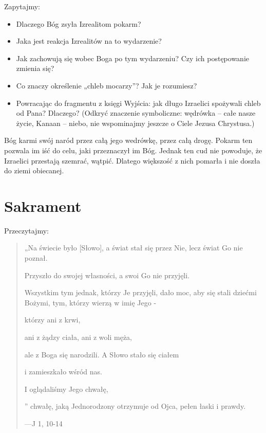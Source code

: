 \documentclass[a5paper,10pt,polish]{book}
\begin{document}
Zapytajmy:
\begin{itemize}
\item {} 
Dlaczego Bóg zsyła Izrealitom pokarm?

\item {} 
Jaka jest reakcja Izrealitów na to wydarzenie?

\item {} 
Jak zachowują się wobec Boga po tym wydarzeniu? Czy ich postępowanie zmienia się?

\item {} 
Co znaczy określenie „chleb mocarzy”? Jak je rozumiesz?

\item {} 
Powracając do fragmentu z księgi Wyjścia: jak długo Izraelici spożywali chleb od Pana? Dlaczego? (Odkryć znaczenie symboliczne: wędrówka – całe nasze życie, Kanaan – niebo, nie wspominajmy jeszcze o Ciele Jezusa Chrystusa.)

\end{itemize}

Bóg karmi swój naród przez całą jego wedrówkę, przez całą drogę. Pokarm ten pozwala im iść do celu, jaki przeznaczył im Bóg. Jednak ten cud nie powoduje, że Izraelici przestają szemrać, wątpić. Dlatego większość z nich pomarła i nie doszła do ziemi obiecanej.


\section{Sakrament}
\label{babice2006-jesien-knurow/spotkanie2:sakrament}
Przeczytajmy:
\begin{quote}

\begin{DUlineblock}{0em}
\item[] „Na świecie było {[}Słowo{]}, a świat stał się przez Nie, lecz świat Go nie poznał.
\item[] Przyszło do swojej własności, a swoi Go nie przyjęli.
\item[] Wszystkim tym jednak, którzy Je przyjęli, dało moc, aby się stali dziećmi Bożymi, tym, którzy wierzą w imię Jego -
\item[] którzy ani z krwi,
\item[] ani z żądzy ciała, ani z woli męża,
\item[] ale z Boga się narodzili. A Słowo stało się ciałem
\item[] i zamieszkało wśród nas.
\item[] I oglądaliśmy Jego chwałę,
\end{DUlineblock}

'' chwałę, jaką Jednorodzony otrzymuje od Ojca, pełen łaski i prawdy.

\begin{flushright}
---J 1, 10-14
\end{flushright}
\end{quote}
\end{document}
